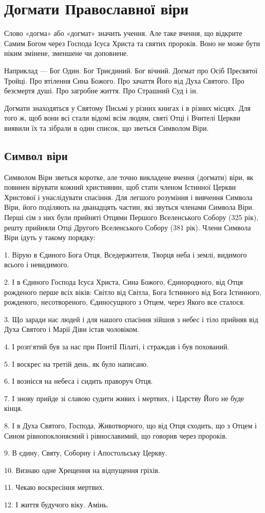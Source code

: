 \documentclass[main.tex]{subfiles}
\begin{document}
\chapter{Догмати Православної віри}
Слово «догма» або «догмат» значить учення. Але таке вчення, що відкрите Самим Богом через Господа Ісуса Христа та святих пророків. Воно не може бути ніким змінене, зменшене чи доповнене.

Наприклад — Бог Один. Бог Триєдиний. Бог вічний. Догмат про Осіб Пресвятої Тройці. Про втілення Сина Божого. Про зачаття Його від Духа Святого. Про безсмертя душі. Про загробне життя. Про Страшний Суд і ін.

Догмати знаходяться у Святому Письмі у різних книгах і в різних місцях. Для того ж, щоб вони всі стали відомі всім людям, святі Отці і Вчителі Церкви виявили їх та зібрали в один список, що зветься Символом Віри.
\section{Символ віри}

Символом Віри зветься коротке, але точно викладене вчення (догмати) віри, як повинен вірувати кожний християнин, щоб стати членом Істинної Церкви Христової і унаслідувати спасіння. Для легшого розуміння і вивчення Символа Віри, його поділяють на дванадцять частин, які звуться членами Символа Віри. Перші сім з них були прийняті Отцями Першого Вселенського Собору (325 рік), решту прийняли Отці Другого Вселенського Собору (381 рік). Члени Символа Віри ідуть у такому порядку:
\begin{FlushRight}
    1. Вірую в Єдиного Бога Отця, Вседержителя, Творця неба і землі, видимого всього і невидимого.

    2. І в Єдиного Господа Ісуса Христа, Сина Божого, Єдинородного, від Отця рожденого перше всіх віків: Світло від Світла, Бога Істинного від Бога Істинного, рожденого, несотвореного, Єдиносущного з Отцем, через Якого все сталося.
    
    3. Що заради нас людей і для нашого спасіння зійшов з небес і тіло прийняв від Духа Святого і Марії Діви істав чоловіком.
    
    4. І розп`ятий був за нас при ПонтіІ Пілаті, і страждав і був похований.

    5. І воскрес на третій день, як було написано.

    6. І вознісся на небеса і сидить праворуч Отця.

    7. І знову прийде зі славою судити живих і мертвих, і Царству Його не буде кінця.

    8. І в Духа Святого, Господа, Животворчого, що від Отця сходить, що з Отцем і Сином рівнопоклоняємий і рівнославимий, що говорив через пророків.

    9. В єдину, Святу, Соборну і Апостольську Церкву.
     
    10. Визнаю одне Хрещення на відпущення гріхів.

    11. Чекаю воскресіння мертвих.

    12. І життя будучого віку. Амінь.
\end{FlushRight}
\end{document}
